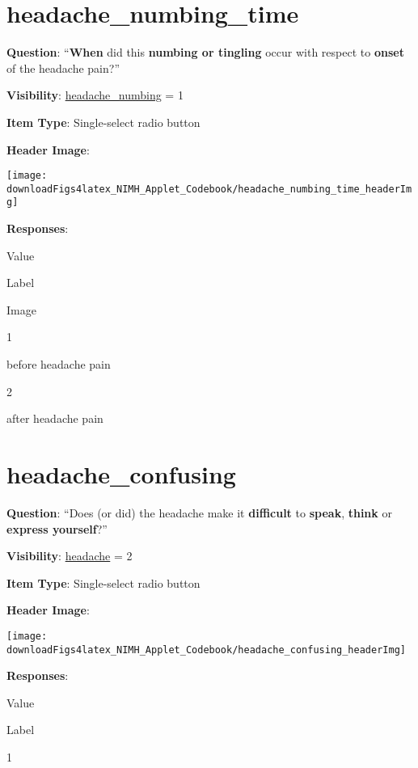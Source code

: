 \documentclass[]{book}
\begin{document}
\hypertarget{headache_numbing_time}{%
\section{headache\_numbing\_time}\label{headache_numbing_time}}

\textbf{Question}: ``\textbf{When} did this \textbf{numbing or tingling} occur with respect to \textbf{onset} of the headache pain?''

\textbf{Visibility}: \protect\hyperlink{headache_numbing}{headache\_numbing} = 1

\textbf{Item Type}: Single-select radio button

\textbf{Header Image}:

\begin{flushleft}\texttt{[image: downloadFigs4latex\_NIMH\_Applet\_Codebook/headache\_numbing\_time\_headerImg]} \end{flushleft}

\textbf{Responses}:

Value

Label

Image

1

before headache pain

2

after headache pain

\hypertarget{headache_confusing}{%
\section{headache\_confusing}\label{headache_confusing}}

\textbf{Question}: ``Does (or did) the headache make it \textbf{difficult} to \textbf{speak}, \textbf{think} or \textbf{express yourself}?''

\textbf{Visibility}: \protect\hyperlink{headache}{headache} = 2

\textbf{Item Type}: Single-select radio button

\textbf{Header Image}:

\begin{flushleft}\texttt{[image: downloadFigs4latex\_NIMH\_Applet\_Codebook/headache\_confusing\_headerImg]} \end{flushleft}

\textbf{Responses}:

Value

Label

1
\end{document}
